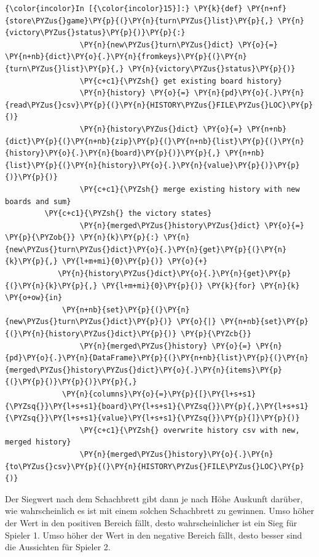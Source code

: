     \begin{Verbatim}[commandchars=\\\{\}]
{\color{incolor}In [{\color{incolor}15}]:} \PY{k}{def} \PY{n+nf}{store\PYZus{}game}\PY{p}{(}\PY{n}{turn\PYZus{}list}\PY{p}{,} \PY{n}{victory\PYZus{}status}\PY{p}{)}\PY{p}{:}
                 \PY{n}{new\PYZus{}turn\PYZus{}dict} \PY{o}{=} \PY{n+nb}{dict}\PY{o}{.}\PY{n}{fromkeys}\PY{p}{(}\PY{n}{turn\PYZus{}list}\PY{p}{,} \PY{n}{victory\PYZus{}status}\PY{p}{)}
                 \PY{c+c1}{\PYZsh{} get existing board history}
                 \PY{n}{history} \PY{o}{=} \PY{n}{pd}\PY{o}{.}\PY{n}{read\PYZus{}csv}\PY{p}{(}\PY{n}{HISTORY\PYZus{}FILE\PYZus{}LOC}\PY{p}{)}
                 \PY{n}{history\PYZus{}dict} \PY{o}{=} \PY{n+nb}{dict}\PY{p}{(}\PY{n+nb}{zip}\PY{p}{(}\PY{n+nb}{list}\PY{p}{(}\PY{n}{history}\PY{o}{.}\PY{n}{board}\PY{p}{)}\PY{p}{,} \PY{n+nb}{list}\PY{p}{(}\PY{n}{history}\PY{o}{.}\PY{n}{value}\PY{p}{)}\PY{p}{)}\PY{p}{)}
                 \PY{c+c1}{\PYZsh{} merge existing history with new boards and sum} 
		 \PY{c+c1}{\PYZsh{} the victory states}
                 \PY{n}{merged\PYZus{}history\PYZus{}dict} \PY{o}{=} \PY{p}{\PYZob{}} \PY{n}{k}\PY{p}{:} \PY{n}{new\PYZus{}turn\PYZus{}dict}\PY{o}{.}\PY{n}{get}\PY{p}{(}\PY{n}{k}\PY{p}{,} \PY{l+m+mi}{0}\PY{p}{)} \PY{o}{+}
 			\PY{n}{history\PYZus{}dict}\PY{o}{.}\PY{n}{get}\PY{p}{(}\PY{n}{k}\PY{p}{,} \PY{l+m+mi}{0}\PY{p}{)} \PY{k}{for} \PY{n}{k} \PY{o+ow}{in} 
			 \PY{n+nb}{set}\PY{p}{(}\PY{n}{new\PYZus{}turn\PYZus{}dict}\PY{p}{)} \PY{o}{|} \PY{n+nb}{set}\PY{p}{(}\PY{n}{history\PYZus{}dict}\PY{p}{)} \PY{p}{\PYZcb{}}
                 \PY{n}{merged\PYZus{}history} \PY{o}{=} \PY{n}{pd}\PY{o}{.}\PY{n}{DataFrame}\PY{p}{(}\PY{n+nb}{list}\PY{p}{(}\PY{n}{merged\PYZus{}history\PYZus{}dict}\PY{o}{.}\PY{n}{items}\PY{p}{(}\PY{p}{)}\PY{p}{)}\PY{p}{,} 
			 \PY{n}{columns}\PY{o}{=}\PY{p}{[}\PY{l+s+s1}{\PYZsq{}}\PY{l+s+s1}{board}\PY{l+s+s1}{\PYZsq{}}\PY{p}{,}\PY{l+s+s1}{\PYZsq{}}\PY{l+s+s1}{value}\PY{l+s+s1}{\PYZsq{}}\PY{p}{]}\PY{p}{)}
                 \PY{c+c1}{\PYZsh{} overwrite history csv with new, merged history}
                 \PY{n}{merged\PYZus{}history}\PY{o}{.}\PY{n}{to\PYZus{}csv}\PY{p}{(}\PY{n}{HISTORY\PYZus{}FILE\PYZus{}LOC}\PY{p}{)}
\end{Verbatim}


    Der Siegwert nach dem Schachbrett gibt dann je nach Höhe Auskunft
darüber, wie wahrscheinlich es ist mit einem solchen Schachbrett zu
gewinnen. Umso höher der Wert in den positiven Bereich fällt, desto
wahrscheinlicher ist ein Sieg für Spieler 1. Umso höher der Wert in den
negative Bereich fällt, desto besser sind die Aussichten für Spieler 2.

